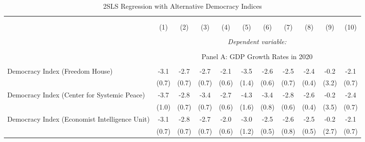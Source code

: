 
\begin{landscape}
\begin{table}[!htbp] \centering 
  \caption{2SLS Regression with Alternative Democracy Indices} 
  \label{tab:2sls-compare-indices} 
    \begin{threeparttable}
\begin{tabular}{@{\extracolsep{0pt}}lcccccccccc} 
\\[-1.8ex]\hline 
\hline \\[-1.8ex] 
\\[-1.8ex] & (1) & (2) & (3) & (4) & (5) & (6) & (7) & (8) & (9) & (10)\\ 
\hline \\[-1.8ex] 
 & \multicolumn{10}{c}{\textit{Dependent variable:}} \\ 
\cline{2-11} 
\\[-1.8ex] & \multicolumn{10}{c}{Panel A: GDP Growth Rates in 2020} \\  \\
Democracy Index (Freedom House)   &        -3.1\sym{***}&        -2.7\sym{***}&        -2.7\sym{***}&        -2.1\sym{***}&        -3.5\sym{*}  &        -2.6\sym{***}&        -2.5\sym{***}&        -2.4\sym{***}&        -0.2         &        -2.1\sym{**} \\
                    &       (0.7)         &       (0.7)         &       (0.7)         &       (0.6)         &       (1.4)         &       (0.6)         &       (0.7)         &       (0.4)         &       (3.2)         &       (0.7)         \\
Democracy Index (Center for Systemic Peace)    &        -3.7\sym{***}&        -2.8\sym{***}&        -3.4\sym{***}&        -2.7\sym{***}&        -4.3\sym{**} &        -3.4\sym{***}&        -2.8\sym{***}&        -2.6\sym{***}&        -0.2         &        -2.4\sym{**} \\
                    &       (1.0)         &       (0.7)         &       (0.7)         &       (0.6)         &       (1.6)         &       (0.8)         &       (0.6)         &       (0.4)         &       (3.5)         &       (0.7)         \\
Democracy Index (Economist Intelligence Unit) &  -3.1\sym{***}&        -2.8\sym{***}&        -2.7\sym{***}&        -2.0\sym{***}&        -3.0\sym{*}  &        -2.5\sym{***}&        -2.6\sym{***}&        -2.5\sym{***}&        -0.2         &        -2.1\sym{**} \\
                    &       (0.7)         &       (0.7)         &       (0.7)         &       (0.6)         &       (1.2)         &       (0.5)         &       (0.8)         &       (0.5)         &       (2.7)         &       (0.7)         \\


\end{tabular}
\end{threeparttable}
\end{table}
\end{landscape}
